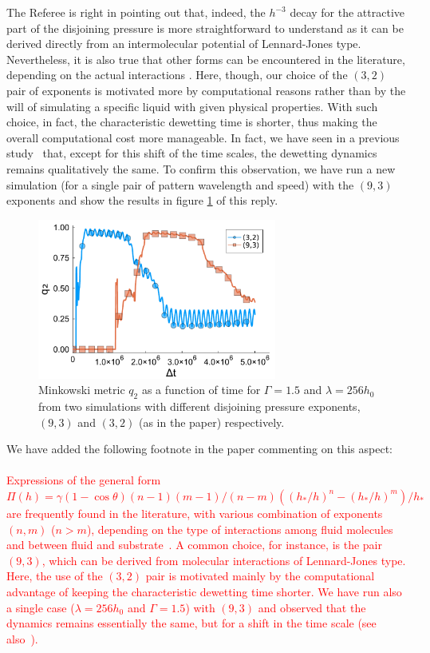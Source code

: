 \documentclass[12pt,english]{article}
\begin{document}
\begin{itemize}
{\item[ \textbf{Answer}]
{
The Referee is right in pointing out that, indeed, the $h^{-3}$ decay 
for the attractive part of the disjoining pressure is more straightforward 
to understand as it can be derived directly from an intermolecular potential of Lennard-Jones type. Nevertheless, it is also true that other forms
can be encountered in the literature, depending on the actual interactions
\cite{SCHWARTZ1998173,Mitlin,Teletzke}. Here, though, our choice of the $(3,2)$ pair of exponents is motivated more by computational reasons rather than by the will of 
simulating a specific liquid with given physical properties.
With such choice, in fact, the characteristic dewetting time 
is shorter, thus making the overall computational cost more manageable.
In fact, we have seen in a previous study~\cite{PhysRevE.104.034801} that,
except for this shift of the time scales, the dewetting dynamics remains 
qualitatively the same. To confirm this observation, we have run 
a new simulation (for a single pair of pattern wavelength and speed) 
with the $(9,3)$ exponents and show the results in figure \ref{fig:rivulets_9_3} of this reply.
\begin{figure}
    \centering
    \includegraphics[width=0.7\textwidth]{refBFig_1.pdf}
    \caption{Minkowski metric $q_2$ as a function of time for 
    $\Gamma = 1.5$ and $\lambda = 256 h_0$ from two simulations with different disjoining 
    pressure exponents, $(9,3)$ and $(3,2)$ (as in the paper) respectively.}
    \label{fig:rivulets_9_3}
\end{figure}
We have added the following footnote in the paper commenting on this aspect:\\
\\
\textcolor{red}{Expressions of 
the general form $\Pi(h) = \gamma(1-\cos \theta)(n-1)(m-1)/(n-m)((h_{\ast}/h)^n - (h_{\ast}/h)^m)/h_{\ast}$
are frequently found in the literature, with various combination of exponents $(n,m)$ ($n>m$), depending
on the type of interactions among fluid molecules and between fluid and substrate~\cite{SCHWARTZ1998173,Mitlin,Teletzke}. A common choice, for instance, is the pair $(9,3)$, which 
can be derived from molecular interactions of Lennard-Jones type. Here, the use of the $(3,2)$ pair is motivated mainly by the computational advantage of keeping the characteristic dewetting time 
shorter. We have run also a single case ($\lambda=256 h_0$ and $\Gamma=1.5$) with $(9,3)$ and observed that 
the dynamics remains essentially the same, but for a shift in the time scale (see also~\cite{PhysRevE.104.034801}).}
}

}
\end{itemize}
\end{document}
